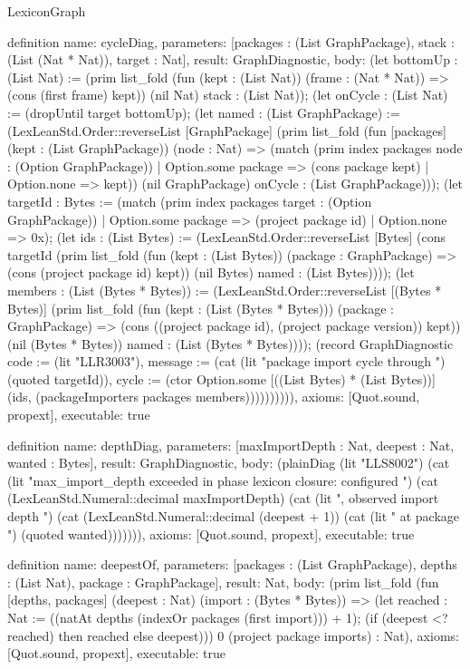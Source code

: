\begin{lexlean}{LexiconGraph}
\begin{semanticmodule}
definition{
  name: cycleDiag,
  parameters: [packages : (List GraphPackage), stack : (List (Nat * Nat)), target : Nat],
  result: GraphDiagnostic,
  body: (let bottomUp : (List Nat) := (prim list_fold (fun (kept : (List Nat)) (frame : (Nat * Nat)) => (cons (first frame) kept)) (nil Nat) stack : (List Nat)); (let onCycle : (List Nat) := (dropUntil target bottomUp); (let named : (List GraphPackage) := (LexLeanStd.Order::reverseList [GraphPackage] (prim list_fold (fun [packages] (kept : (List GraphPackage)) (node : Nat) => (match (prim index packages node : (Option GraphPackage))
    | Option.some package => (cons package kept)
    | Option.none => kept)) (nil GraphPackage) onCycle : (List GraphPackage))); (let targetId : Bytes := (match (prim index packages target : (Option GraphPackage))
    | Option.some package => (project package id)
    | Option.none => 0x); (let ids : (List Bytes) := (LexLeanStd.Order::reverseList [Bytes] (cons targetId (prim list_fold (fun (kept : (List Bytes)) (package : GraphPackage) => (cons (project package id) kept)) (nil Bytes) named : (List Bytes)))); (let members : (List (Bytes * Bytes)) := (LexLeanStd.Order::reverseList [(Bytes * Bytes)] (prim list_fold (fun (kept : (List (Bytes * Bytes))) (package : GraphPackage) => (cons ((project package id), (project package version)) kept)) (nil (Bytes * Bytes)) named : (List (Bytes * Bytes)))); (record GraphDiagnostic {code := (lit "LLR3003"), message := (cat (lit "package import cycle through ") (quoted targetId)), cycle := (ctor Option.some [((List Bytes) * (List Bytes))] (ids, (packageImporters packages members)))}))))))),
  axioms: [Quot.sound, propext],
  executable: true
}

definition{
  name: depthDiag,
  parameters: [maxImportDepth : Nat, deepest : Nat, wanted : Bytes],
  result: GraphDiagnostic,
  body: (plainDiag (lit "LLS8002") (cat (lit "max_import_depth exceeded in phase lexicon closure: configured ") (cat (LexLeanStd.Numeral::decimal maxImportDepth) (cat (lit ", observed import depth ") (cat (LexLeanStd.Numeral::decimal (deepest + 1)) (cat (lit " at package ") (quoted wanted))))))),
  axioms: [Quot.sound, propext],
  executable: true
}

definition{
  name: deepestOf,
  parameters: [packages : (List GraphPackage), depths : (List Nat), package : GraphPackage],
  result: Nat,
  body: (prim list_fold (fun [depths, packages] (deepest : Nat) (import : (Bytes * Bytes)) => (let reached : Nat := ((natAt depths (indexOr packages (first import))) + 1); (if (deepest <? reached) then reached else deepest))) 0 (project package imports) : Nat),
  axioms: [Quot.sound, propext],
  executable: true
}


\end{semanticmodule}
\end{lexlean}
